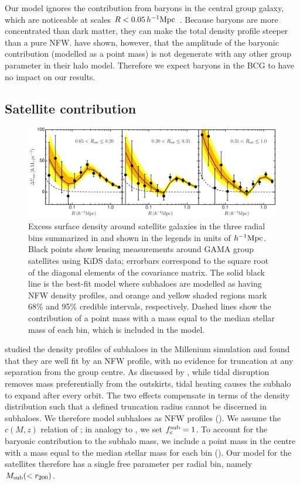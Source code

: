 Our model ignores the contribution from baryons in the central group galaxy, which are noticeable 
at scales $R<0.05\,h^{-1}{\rm Mpc}$ \citep{viola15}. Because baryons are more concentrated than 
dark matter, they can make the total density profile steeper than a pure NFW. \cite{viola15} have 
shown, however, that the amplitude of the baryonic contribution (modelled as a point mass) is not 
degenerate with any other group parameter in their halo model. Therefore we expect baryons in the 
BCG to have no impact on our results.

\subsection{Satellite contribution}\label{s:sigma_sat}

\begin{figure}
 \centerline{\includegraphics[width=\textwidth]{chapter5/esd.pdf}}
\caption{Excess surface density around satellite 
galaxies in the three radial bins summarized in  and shown in the legends in units 
of $h^{-1}{\rm Mpc}$. Black points show lensing measurements around GAMA group satellites using 
KiDS data; errorbars correspond to the square root of the diagonal elements of the covariance 
matrix. The solid black line is the best-fit model where subhaloes are modelled as having NFW 
density profiles, and orange and yellow shaded regions mark 68\% and 95\% credible intervals, 
respectively. Dashed lines show the contribution of a point mass with a mass equal to the median 
stellar mass of each bin, which is included in the model.}
\label{f:esd_satellites}
\end{figure}

\cite{pastormira11} studied the density profiles of subhaloes in the Millenium simulation 
\citep{springel05_millenium} and found that they are well fit by an NFW profile, with no evidence for 
truncation at any separation from the group centre. As discussed by \cite{hayashi03}, while tidal 
disruption removes mass preferentially from the outskirts, tidal heating causes the subhalo to 
expand after every orbit. The two effects compensate in terms of the density distribution such that 
a defined truncation radius cannot be discerned in subhaloes. We therefore model subhaloes as NFW 
profiles (). We assume the $c(M,z)$ relation of \cite{duffy08}; in analogy to 
, we set $f_c^{\rm sub}=1$. To account for the baryonic contribution to the subhalo 
mass, we include a point mass in the centre with a mass equal to the median stellar mass for each 
bin (). Our model for the satellites therefore has a single free parameter per radial 
bin, namely $M_{\rm sub}(<r_{200})$.

